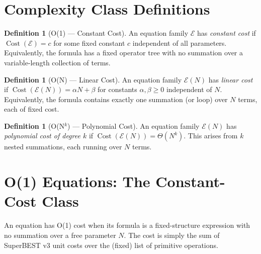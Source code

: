 \documentclass[12pt,a4paper]{article}
\theoremstyle{definition}
\newtheorem{definition}[theorem]{Definition}
\newcommand{\Cost}{\operatorname{Cost}}
\begin{document}
\section{Complexity Class Definitions}
\label{sec:classes}

\begin{definition}[O(1) --- Constant Cost]
\label{def:O1}
An equation family $\mathcal{E}$ has \emph{constant cost} if
$\Cost(\mathcal{E}) = c$ for some fixed constant $c$ independent of
all parameters.  Equivalently, the formula has a fixed operator tree
with no summation over a variable-length collection of terms.
\end{definition}

\begin{definition}[O(N) --- Linear Cost]
\label{def:ON}
An equation family $\mathcal{E}(N)$ has \emph{linear cost} if
$\Cost(\mathcal{E}(N)) = \alpha N + \beta$ for constants
$\alpha, \beta \geq 0$ independent of $N$.  Equivalently, the formula
contains exactly one summation (or loop) over $N$ terms, each of
fixed cost.
\end{definition}

\begin{definition}[O(N$^k$) --- Polynomial Cost]
\label{def:ONk}
An equation family $\mathcal{E}(N)$ has \emph{polynomial cost of
degree $k$} if $\Cost(\mathcal{E}(N)) = \Theta(N^k)$.  This arises
from $k$ nested summations, each running over $N$ terms.
\end{definition}

\section{O(1) Equations: The Constant-Cost Class}
\label{sec:O1}

An equation has O(1) cost when its formula is a fixed-structure
expression with no summation over a free parameter $N$.  The cost is
simply the sum of SuperBEST v3 unit costs over the (fixed) list of
primitive operations.
\end{document}
